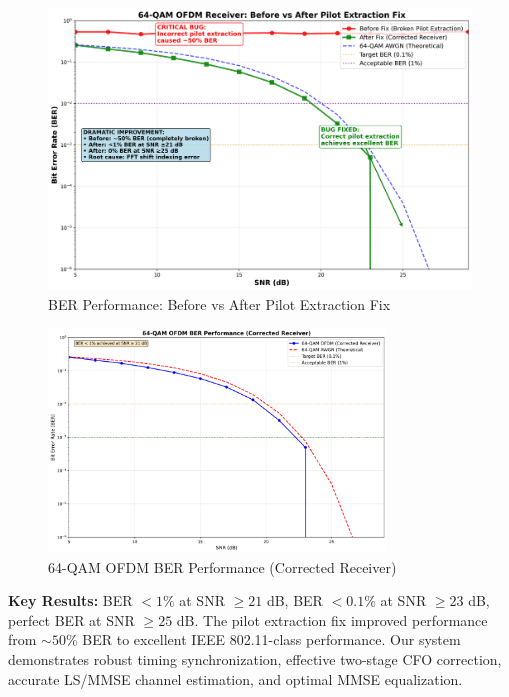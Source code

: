 \documentclass[11pt,a4paper]{article}
\begin{document}
\begin{figure}[H]
    \centering
    \includegraphics[width=\textwidth]{ber_before_after_comparison.png}
    \caption{BER Performance: Before vs After Pilot Extraction Fix}
    \label{fig:ber_comparison}
\end{figure}

\begin{figure}[H]
    \centering
    \includegraphics[width=0.8\textwidth]{corrected_ber_curves.png}
    \caption{64-QAM OFDM BER Performance (Corrected Receiver)}
    \label{fig:ber_curves}
\end{figure}

\textbf{Key Results:} BER $< 1\%$ at SNR $\geq 21$ dB, BER $< 0.1\%$ at SNR $\geq 23$ dB, perfect BER at SNR $\geq 25$ dB. The pilot extraction fix improved performance from $\sim 50\%$ BER to excellent IEEE 802.11-class performance. Our system demonstrates robust timing synchronization, effective two-stage CFO correction, accurate LS/MMSE channel estimation, and optimal MMSE equalization.
\end{document}
